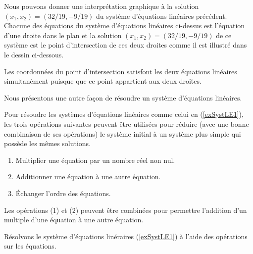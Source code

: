 {\begin{egg}
Nous pouvons donner une interprétation graphique à la solution
$(x_1,x_2) = (32/19, -9/19)$ du système d'équations linéaires précédent.
Chacune des équations du système d'équations linéaires ci-dessus est
l'équation d'une droite dans le plan et la solution
$(x_1,x_2) = (32/19, -9/19)$ de ce système est le point d'intersection de
ces deux droites comme il est illustré dans le dessin ci-dessous.

Les coordonnées du point d'intersection satisfont les deux équations
linéaires simultanément puisque que ce point appartient aux deux
droites.
\end{egg}

Nous présentons une autre façon de résoudre un système d'équations
linéaires.

\begin{focus}{\mth} \label{opOnRows}
Pour résoudre les systèmes d'équations linéaires comme celui en
(\ref{exSystLE1}), les trois opérations suivantes peuvent être
utilisées pour réduire (avec une bonne combinaison de ses opérations)
le système initial à un système plus simple qui possède les mêmes
solutions.
\begin{enumerate}
\item Multiplier une équation par un nombre réel non nul.
\item Additionner une équation à une autre équation.
\item Échanger l'ordre des équations.
\end{enumerate}
\end{focus}

Les opérations (1) et (2) peuvent être combinées pour permettre
l'addition d'un multiple d'une équation à une autre équation.

\begin{egg}
Résolvons le système d'équations linéraires (\ref{exSystLE1}) à l'aide
des opérations sur les équations.


\end{egg}}
